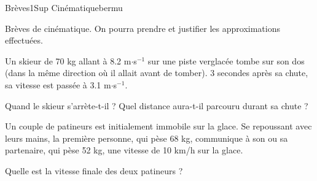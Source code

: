 \begin{exercise}{Brèves}{1}{Sup}
{Cinématique}{bermu}

Brèves de cinématique. On pourra prendre et justifier les approximations effectuées.

\begin{questions}
    \question Un skieur de 70 kg allant à 8.2 m$\cdot$s$^{-1}$ sur une piste verglacée tombe sur son dos (dans la même direction où il allait avant de tomber). 3 secondes après sa chute, sa vitesse est passée à 3.1 m$\cdot$s$^{-1}$.

    Quand le skieur s'arrète-t-il ? Quel distance aura-t-il parcouru durant sa chute ?

    \question Un couple de patineurs est initialement immobile sur la glace. Se repoussant avec leurs mains, la première personne, qui pèse 68 kg, communique à son ou sa partenaire, qui pèse 52 kg, une vitesse de 10 km/h sur la glace.
    
    Quelle est la vitesse finale des deux patineurs ?
\end{questions}

\end{exercise}

\begin{solution}

\end{solution}
